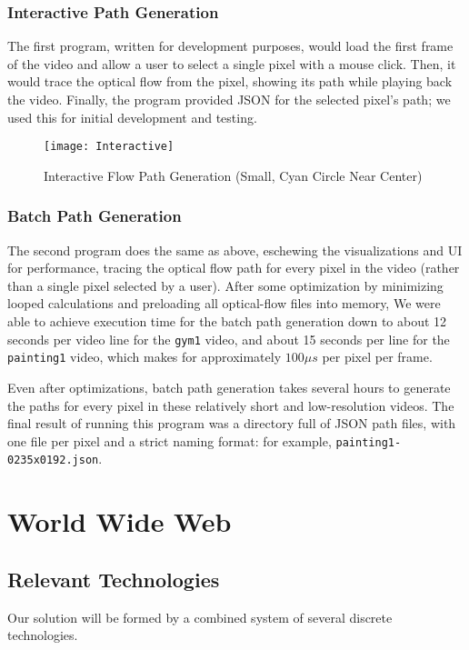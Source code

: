 \subsubsection{Interactive Path Generation}
The first program, written for development purposes, would load the first frame of the video and allow a user to select a single pixel with a mouse click. Then, it would trace the optical flow from the pixel, showing its path while playing back the video. Finally, the program provided JSON for the selected pixel's path; we used this for initial development and testing.

\begin{figure}[h]
\centering
\texttt{[image: Interactive]}
\caption{Interactive Flow Path Generation (Small, Cyan Circle Near Center)}
\end{figure}

\subsubsection{Batch Path Generation}
\label{batchpathgen}
The second program does the same as above, eschewing the visualizations and UI for performance, tracing the optical flow path for every pixel in the video (rather than a single pixel selected by a user). After some optimization by minimizing looped calculations and preloading all optical-flow files into memory, We were able to achieve execution time for the batch path generation down to about 12 seconds per video line for the \texttt{gym1} video, and about 15 seconds per line for the \texttt{painting1} video, which makes for approximately $100 \mu s$ per pixel per frame.
\par Even after optimizations, batch path generation takes several hours to generate the paths for every pixel in these relatively short and low-resolution videos. The final result of running this program was a directory full of JSON path files, with one file per pixel and a strict naming format: for example, \texttt{painting1-0235x0192.json}.




\section{World Wide Web}
\subsection{Relevant Technologies}
\label{technologies}
Our solution will be formed by a combined system of several discrete technologies.

